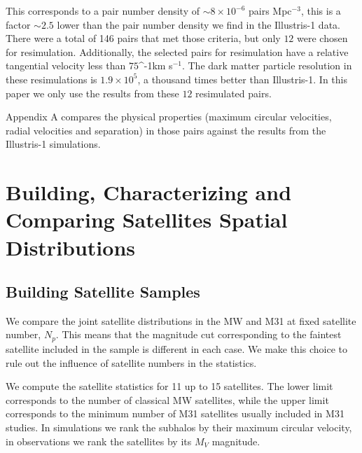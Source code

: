 \documentclass[a4paper,fleqn,usenatbib]{mnras}
\newcommand{\kms}{\ifmmode\mathrm{km\ s}^{-1}\else km s$^{-1}$\fi}
\begin{document}
This corresponds to a pair number density of $\sim 8 \times10^{-6}$ pairs
Mpc$^{-3}$, this is a factor $\sim 2.5$ lower than the pair number density
we find in the Illustris-1 data.
There were a total of 146 pairs that met those criteria, but only $12$
were chosen for resimulation. 
Additionally, the selected pairs for resimulation have a relative
tangential velocity less than $75 $\kms. 
The dark matter particle resolution in these resimulations is
$1.9\times 10^5$, a thousand times better than Illustris-1.
In this paper we only use the results from these $12$ resimulated pairs.

Appendix A compares the physical properties (maximum circular
velocities, radial velocities and separation) in those pairs against
the results from the Illustris-1 simulations.  

\section{Building, Characterizing and Comparing Satellites Spatial Distributions}
\label{sec:SpatialMeasurements}


\subsection{Building Satellite Samples}

We compare the joint satellite distributions in the MW and M31 at fixed
satellite number, $N_p$.
This means that the magnitude cut corresponding to the faintest
satellite included in the sample is different in each case.
We make this choice to rule out the influence of satellite numbers
in the statistics. 

We compute the satellite statistics for 11 up to 15 satellites.
The lower limit corresponds to the number of classical MW satellites,
while the upper limit corresponds to the minimum number of M31
satellites usually included in M31 studies.
In simulations we rank the subhalos by their maximum circular
velocity, in observations we rank the satellites by its $M_V$
magnitude.  
\end{document}
